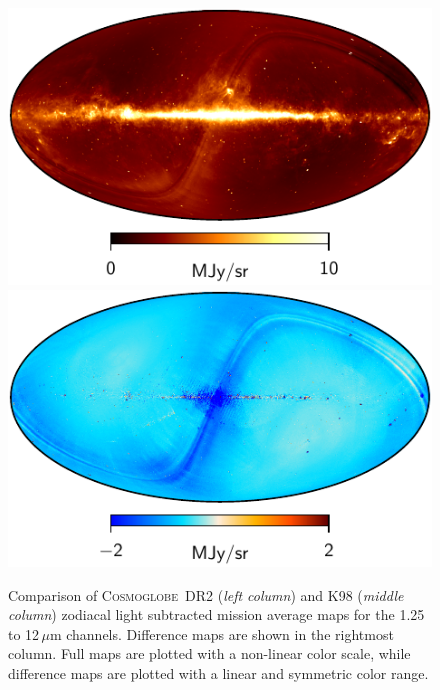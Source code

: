 \documentclass{aa}
\def\Cosmoglobe{\textsc{Cosmoglobe}}
\begin{document}
\begin{figure}
        \includegraphics[width=0.33\linewidth]{figs/DIRBE_ZSMA_05_1_256.pdf}
        \includegraphics[width=0.33\linewidth]{figs/diff_CG_DIRBE_ZSMA_05_n256.pdf}
	\caption{Comparison of \Cosmoglobe\ DR2 (\emph{left column}) and K98 (\emph{middle column}) zodiacal light subtracted mission average maps for the 1.25 to 12$\,\mu$m channels. Difference maps are shown in the rightmost column. Full maps are plotted with a non-linear color scale, while difference maps are plotted with a linear and symmetric color range.}
	\label{fig:freqmaps_cg_vs_dirbe1}
\end{figure}
\end{document}
